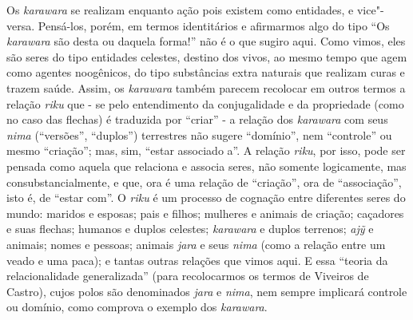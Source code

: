 Os \emph{karawara} se realizam enquanto ação pois existem como
entidades, e vice"-versa. Pensá-los, porém, em termos identitários e
afirmarmos algo do tipo ``Os \emph{karawara} são desta ou daquela forma!''
não é o que sugiro aqui. Como vimos, eles são seres do tipo entidades
celestes, destino dos vivos, ao mesmo tempo que agem como agentes
noogênicos, do tipo substâncias extra naturais que realizam curas e
trazem saúde. Assim, os \emph{karawara} também parecem recolocar em
outros termos a relação \emph{riku} que - se pelo entendimento da
conjugalidade e da propriedade (como no caso das flechas) é traduzida
por ``criar'' - a relação dos \emph{karawara} com seus \emph{nima}
(``versões'', ``duplos'') terrestres não sugere ``domínio'', nem ``controle'' ou
mesmo ``criação''; mas, sim, ``estar associado a''. A relação \emph{riku},
por isso, pode ser pensada como aquela que relaciona e associa seres,
não somente logicamente, mas consubstancialmente, e que, ora é uma
relação de ``criação'', ora de ``associação'', isto é, de ``estar com''. O
\emph{riku} é um processo de cognação entre diferentes seres do mundo:
maridos e esposas; pais e filhos; mulheres e animais de criação;
caçadores e suas flechas; humanos e duplos celestes; \emph{karawara} e
duplos terrenos; \emph{ajỹ} e animais; nomes e pessoas; animais
\emph{jara} e seus \emph{nima} (como a relação entre um veado e uma
paca); e tantas outras relações que vimos aqui. E essa ``teoria da
relacionalidade generalizada'' (para recolocarmos os termos de Viveiros
de Castro), cujos polos são denominados \emph{jara} e \emph{nima}, nem
sempre implicará controle ou domínio, como comprova o exemplo dos
\emph{karawara}.

